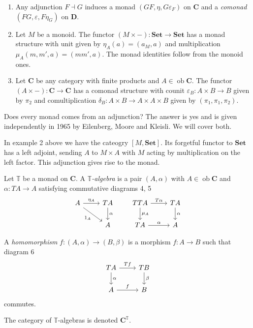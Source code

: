 \documentclass[a4paper]{article}
\renewcommand{\c}[1]{\mathbf{#1}}
\DeclareMathOperator{\ob}{ob}
\newcommand{\Set}{{\c{Set}}}
\newcommand{\adjoint}{\dashv}
\newcommand{\T}{{\mathbb{T}}} %
\begin{document}
\begin{eg}\leavevmode
  \begin{enumerate}
  \item Any adjunction \(F \adjoint G\) induces a monad \((GF, \eta, G\varepsilon_F)\) on \(\c C\) and a \emph{comonad} \((FG, \varepsilon, F\eta_G)\) on \(\c D\).
  \item Let \(M\) be a monoid. The functor \((M \times - ): \Set \to \Set\) has a monad structure with unit given by \(\eta_A(a) = (a_M, a)\) and multiplication \(\mu_A(m, m', a) = (mm', a)\). The monad identities follow from the monoid ones.
  \item Let \(\c C\) be any category with finite products and \(A \in \ob \c C\). The functor \((A \times -): \c C \to \c C\) has a comonad structure with counit \(\varepsilon_B: A \times B \to B\) given by \(\pi_2\) and comultiplication \(\delta_B: A \times B \to A \times A \times B\) given by \((\pi_1, \pi_1, \pi_2)\).
  \end{enumerate}
\end{eg}

Does every monad comes from an adjunction? The answer is yes and is given independently in 1965 by Eilenberg, Moore and Kleisli. We will cover both.

In example 2 above we have the cateogry \([M, \Set]\). Its forgetful functor to \(\Set\) has a left adjoint, sending \(A\) to \(M \times A\) with \(M\) acting by multiplication on the left factor. This adjunction gives rise to the monad.

\begin{definition}
  Let \(\T\) be a monad on \(\c C\). A \emph{\(\T\)-algebra} is a pair \((A, \alpha)\) with \(A \in \ob \c C\) and \(\alpha: TA \to A\) satisfying commutative diagrams 4, 5
  \[
    \begin{tikzcd}
      A \ar[r, "\eta_A"] \ar[dr, "1_A"'] & TA \ar[d, "\alpha"] \\
      & A
    \end{tikzcd}
    \qquad
    \begin{tikzcd}
      TTA \ar[r, "T\alpha"] \ar[d, "\mu_A"] & TA \ar[d, "\alpha"] \\
      TA \ar[r, "\alpha"] & A
    \end{tikzcd}
  \]

  A \emph{homomorphism} \(f: (A, \alpha) \to (B, \beta)\) is a morphism \(f: A \to B\) such that diagram 6
  \[
    \begin{tikzcd}
      TA \ar[r, "Tf"] \ar[d, "\alpha"] & TB \ar[d, "\beta"] \\
      A \ar[r, "f"] & B
    \end{tikzcd}
  \]
  commutes.

  The category of \(\T\)-algebras is denoted \(\c C^\T\).
\end{definition}
\end{document}
